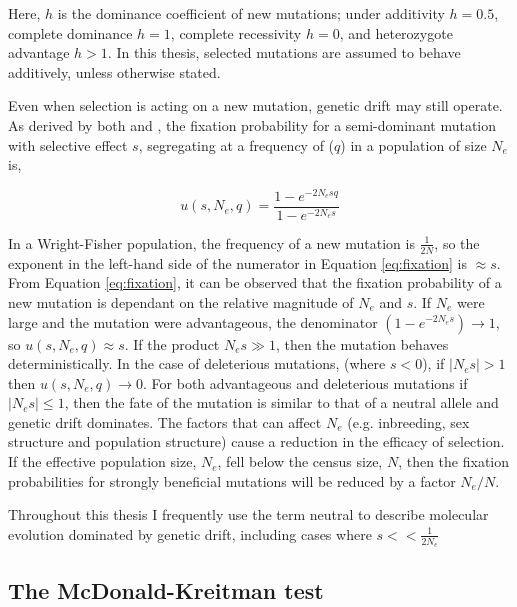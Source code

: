 \noindent

Here, $h$ is the dominance coefficient of new mutations; under additivity $h = 0.5$,  complete dominance $h = 1$, complete recessivity $h = 0$, and heterozygote advantage $h > 1$. In this thesis, selected mutations are assumed to behave additively, unless otherwise stated. 

	Even when selection is acting on a new mutation, genetic drift may still operate. As derived by both \cite{RN399} and \cite{RN199}, the fixation probability for a semi-dominant mutation with selective effect $s$, segregating at a frequency of ($q$) in a population of size $N_e$ is,

\begin{equation}
	u(s, N_e, q) = \frac{1 - e^{-2N_esq}}{1 - e^{-2N_es}}
	\label{eq:fixation}
\end{equation}

\noindent
In a Wright-Fisher population, the frequency of a new mutation is $\frac{1}{2N}$, so the exponent in the left-hand side of the numerator in Equation \ref{eq:fixation} is $\approx s$. From Equation \ref{eq:fixation}, it can be observed that the fixation probability of a new mutation is dependant on the relative magnitude of $N_e$ and $s$. If $N_e$ were large and the mutation were advantageous, the denominator $(1 - e^{-2N_es}) \to 1$, so $u(s, N_e, q) \approx s$. If the product $N_es \gg 1$, then the mutation behaves deterministically. In the case of deleterious mutations, (where $s < 0$), if $|N_es| > 1$ then $u(s, N_e, q) \to 0$.  For both advantageous and deleterious mutations if $|N_es| \leq 1$, then the fate of the mutation is similar to that of a neutral allele and genetic drift dominates. The factors that can affect $N_e$ (e.g. inbreeding, sex structure and population structure) cause a reduction in the efficacy of selection. If the effective population size, $N_e$, fell below the census size, $N$, then the fixation probabilities for strongly beneficial mutations will be reduced by a factor $N_e/N$.

	Throughout this thesis I frequently use the term neutral to describe molecular evolution dominated by genetic drift, including cases where $s << \frac{1}{2N_e}$

\subsection{The McDonald-Kreitman test}

